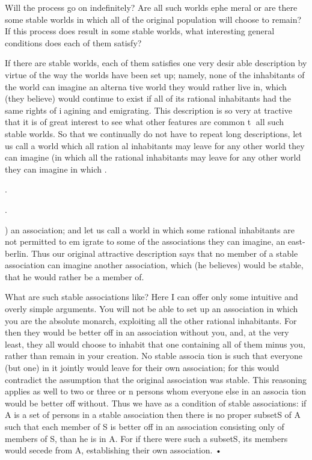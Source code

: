 \documentclass[11pt,openany]{book}
\begin{document}
Will the process go on indefinitely? Are all such worlds ephe meral or are there some stable worlds in which all of the original population will choose to remain? If this process does result in some stable worlds, what interesting general conditions does each of them satisfy? 

If there are stable worlds, each of them satisfies one very desir able description by virtue of the way the worlds have been set up; namely, none of the inhabitants of the world can imagine an alterna tive world they would rather live in, which (they believe) would continue to exist if all of its rational inhabitants had the same rights of iagining and emigrating. This description is so very at tractive that it is of great interest to see what other features are common t all such stable worlds. So that we continually do not have to repeat long descriptions, let us call a world which all ration al inhabitants may leave for any other world they can imagine (in which all the rational inhabitants may leave for any other world they can imagine in which .

.

.

) an association; and let us call a world in which some rational inhabitants are not permitted to em igrate to some of the associations they can imagine, an east-berlin. Thus our original attractive description says that no member of a stable association can imagine another association, which (he believes) would be stable, that he would rather be a member of. 

What are such stable associations like? Here I can offer only some intuitive and overly simple arguments. You will not be able to set up an association in which you are the absolute monarch, exploiting all the other rational inhabitants. For then they would be better off in an association without you, and, at the very least, they all would choose to inhabit that one containing all of them minus you, rather than remain in your creation. No stable associa tion is such that everyone (but one) in it jointly would leave for their own association; for this would contradict the assumption that the original association was stable. This reasoning applies as well to two or three or n persons whom everyone else in an associa tion would be better off without. Thus we have as a condition of stable associations: if A is a set of persons in a stable association then there is no proper subsetS of A such that each member of S is better off in an association consisting only of members of S, than he is in A. For if there were such a subsetS, its members would secede from A, establishing their own association. • 
\end{document}
